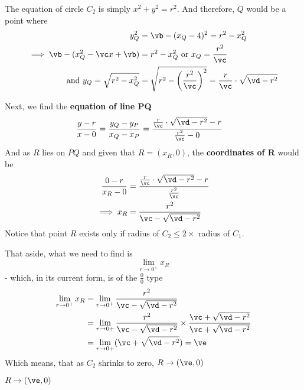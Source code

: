 \begin{solution}[\fullpage]
  The equation of circle $C_2$ is simply $x^2 + y^2 = r^2$.
  And therefore, $Q$ would be a point where 
  \begin{align}
    y_Q^2 &= \vb - (x_Q-\va)^2 = r^2 - x_Q^2 \\
    \implies \vb - (x_Q^2 - \vc x + \vb) &= r^2 - x_Q^2 \text{ or } x_Q = \dfrac{r^2} {\vc} \\
    \text{ and }y_Q = \sqrt{r^2 - x_Q^2} &= \sqrt{r^2 - \left( \dfrac{r^2}{\vc}\right)^2}
    = \dfrac{r}{\vc}\cdot\sqrt{\vd - r^2}
  \end{align}
  
  Next, we find the \textbf{equation of line PQ}
  \begin{align}
    \dfrac{y-r}{x-0} &= \dfrac{y_Q-y_P}{x_Q-x_P} = 
    \dfrac{\frac{r}{\vc}\cdot\sqrt{\vd-r^2}-r}{\frac{r^2}{\vc} - 0}
  \end{align}
  And as $R$ lies on $PQ$ and given that $R=(x_R,0)$, the \textbf{coordinates of R} would be 
  \begin{align}
    \dfrac{0-r}{x_R-0} &= \dfrac{\frac{r}{\vc}\cdot\sqrt{\vd-r^2}-r}{\frac{r^2}{\vc}} \\
    \implies x_R &= \dfrac{r^2}{\vc - \sqrt{\vd - r^2}}
  \end{align}
  Notice that point $R$ exists only if radius of $C_2\leq 2\times$ radius of $C_1$.
  
  That aside, what we need to find is \[ \lim_{r\to 0^+} x_R\] - which, in its current form, 
  is of the $\frac{0}{0}$ type
  \begin{align}
    \lim_{r\to 0^+}x_R &= \lim_{r\to 0^+}\dfrac{r^2}{\vc - \sqrt{\vd - r^2}} \\
    &= \lim_{r\to 0+}\dfrac{r^2}{\vc - \sqrt{\vd - r^2}}\times
    \dfrac{\vc + \sqrt{\vd - r^2}}{\vc + \sqrt{\vd - r^2}} \\
    &= \lim_{r\to 0+}(\vc + \sqrt{\vd - r^2}) = \ve
  \end{align}
  Which means, that as $C_2$ shrinks to zero, $R\to (\ve, 0)$
\end{solution}
\ifprintanswers\begin{codex}$R\to(\ve,0)$\end{codex}\fi
